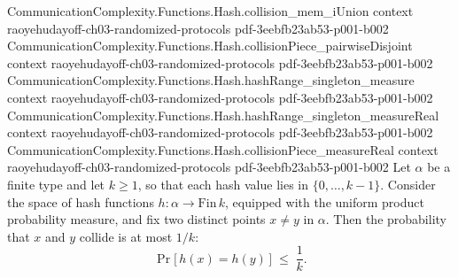 \begin{theorem}
\proofstep
  {CommunicationComplexity.Functions.Hash.collision_mem_iUnion}
  {context}
  {raoyehudayoff-ch03-randomized-protocols}
  {pdf-3eebfb23ab53-p001-b002}
\proofstep
  {CommunicationComplexity.Functions.Hash.collisionPiece_pairwiseDisjoint}
  {context}
  {raoyehudayoff-ch03-randomized-protocols}
  {pdf-3eebfb23ab53-p001-b002}
\proofstep
  {CommunicationComplexity.Functions.Hash.hashRange_singleton_measure}
  {context}
  {raoyehudayoff-ch03-randomized-protocols}
  {pdf-3eebfb23ab53-p001-b002}
\proofstep
  {CommunicationComplexity.Functions.Hash.hashRange_singleton_measureReal}
  {context}
  {raoyehudayoff-ch03-randomized-protocols}
  {pdf-3eebfb23ab53-p001-b002}
\proofstep
  {CommunicationComplexity.Functions.Hash.collisionPiece_measureReal}
  {context}
  {raoyehudayoff-ch03-randomized-protocols}
  {pdf-3eebfb23ab53-p001-b002}
Let $\alpha$ be a finite type and let $k \ge 1$, so that each hash value lies in
$\{0,\dots,k-1\}$. Consider the space of hash functions $h \colon \alpha \to
\mathrm{Fin}\,k$, equipped with the uniform product probability measure, and fix two
distinct points $x \ne y$ in $\alpha$. Then the probability that $x$ and $y$ collide is
at most $1/k$:
\[
  \Pr\bigl[\,h(x) = h(y)\,\bigr] \;\le\; \frac{1}{k}.
\]
\end{theorem}
